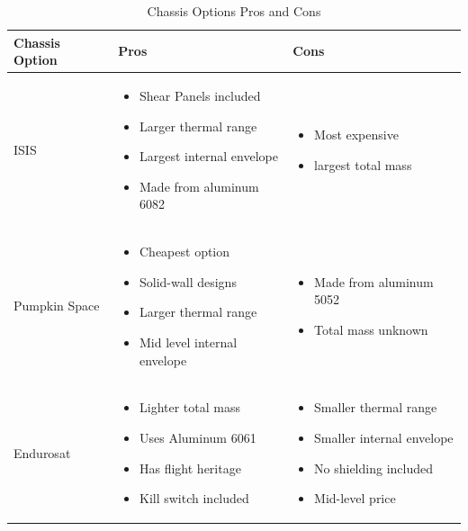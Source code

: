 \begin{table}[H]
\centering
\begin{tabular}{|p{}|p{}|p{}|} 
\hline
\textbf{Chassis Option} & \textbf{Pros} & \textbf{Cons}
\\
\hline
     ISIS
     &
    \begin{itemize}
        \item Shear Panels included
        \item Larger thermal range
        \item Largest internal envelope
        \item Made from aluminum 6082
    \end{itemize}
    &
    \begin{itemize}
        \item Most expensive
        \item largest total mass
    \end{itemize}
    \\
\hline
     Pumpkin Space
     &
    \begin{itemize}
        \item Cheapest option
        \item Solid-wall designs
        \item Larger thermal range
        \item Mid level internal envelope
    \end{itemize}
    &
        \begin{itemize}
        \item Made from aluminum 5052
        \item Total mass unknown
    \end{itemize}
    \\
\hline
    Endurosat
    &
    \begin{itemize}
        \item Lighter total mass
        \item Uses Aluminum 6061
        \item Has flight heritage
        \item Kill switch included
    \end{itemize}
    &
    \begin{itemize}
        \item Smaller thermal range
        \item Smaller internal envelope
        \item No shielding included
        \item Mid-level price
    \end{itemize}
    \\
\hline
\end{tabular}
\caption{Chassis Options Pros and Cons}
\label{tbl:Chassis_ProCon}
\end{table}
